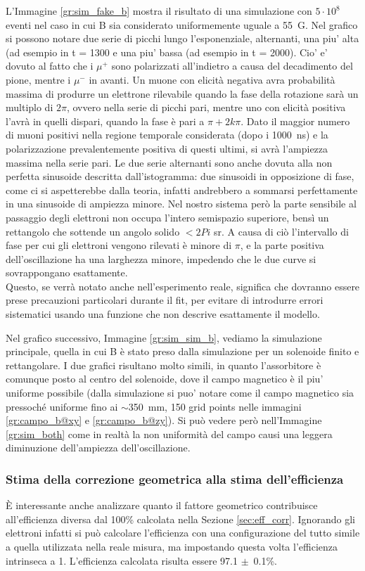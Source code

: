 L'Immagine \ref{gr:sim_fake_b} mostra il risultato di una simulazione con $5\cdot 10^8$ eventi nel caso in cui B sia considerato uniformemente uguale a 55~G. Nel grafico si possono notare due serie di picchi lungo l'esponenziale, alternanti, una piu' alta (ad esempio in t = 1300 e una piu' bassa (ad esempio in t = 2000). Cio' e' dovuto al fatto che i $\mu^+$ sono polarizzati all'indietro a causa del decadimento del pione, mentre i $\mu^-$ in avanti. Un muone con elicit\`a negativa avra probabilit\`a massima di produrre un elettrone rilevabile quando la fase della rotazione sar\`a un multiplo di $2\pi$, ovvero nella serie di picchi pari, mentre uno con elicit\`a positiva l'avr\`a in quelli dispari, quando la fase \`e pari a $\pi+2k\pi$. Dato il maggior numero di muoni positivi nella regione temporale considerata (dopo i 1000~ns) e la polarizzazione prevalentemente positiva di questi ultimi, si avr\`a l'ampiezza massima nella serie pari. Le due serie alternanti sono anche dovuta alla non perfetta sinusoide descritta dall'istogramma: due sinusoidi in opposizione di fase, come ci si aspetterebbe dalla teoria, infatti andrebbero a sommarsi perfettamente in una sinusoide di ampiezza minore. Nel nostro sistema per\`o la parte sensibile al passaggio degli elettroni non occupa l'intero semispazio superiore, bens\`i un rettangolo che sottende un angolo solido $<2Pi$ sr. A causa di ci\`o l'intervallo di fase per cui gli elettroni vengono rilevati \`e minore di $\pi$, e la parte positiva dell'oscillazione ha una larghezza minore, impedendo che le due curve si sovrappongano esattamente.\\
Questo, se verr\`a notato anche nell'esperimento reale, significa che dovranno essere prese precauzioni particolari durante il fit, per evitare di introdurre errori sistematici usando una funzione che non descrive esattamente il modello. 

Nel grafico successivo, Immagine \ref{gr:sim_sim_b}, vediamo la simulazione principale, quella in cui B \`e stato preso dalla simulazione per un solenoide finito e rettangolare. I due grafici risultano molto simili, in quanto l'assorbitore \`e comunque posto al centro del solenoide, dove il campo magnetico \`e il piu' uniforme possibile (dalla simulazione si puo' notare come il campo magnetico sia pressoch\'e uniforme fino ai $\sim$350~mm, 150 grid points nelle immagini \ref{gr:campo_b@xy} e \ref{gr:campo_b@zy}). Si pu\`o vedere per\`o nell'Immagine \ref{gr:sim_both} come in realt\`a la non uniformit\`a del campo causi una leggera diminuzione dell'ampiezza dell'oscillazione.

\subsubsection{Stima della correzione geometrica alla stima dell'efficienza}
\`E interessante anche analizzare quanto il fattore geometrico contribuisce all'efficienza diversa dal 100\% calcolata nella Sezione \ref{sec:eff_corr}. Ignorando gli elettroni infatti si pu\`o calcolare l'efficienza con una configurazione del tutto simile a quella utilizzata nella reale misura, ma impostando questa volta l'efficienza intrinseca a 1. L'efficienza calcolata risulta essere 97.1 $\pm$~0.1\%.
